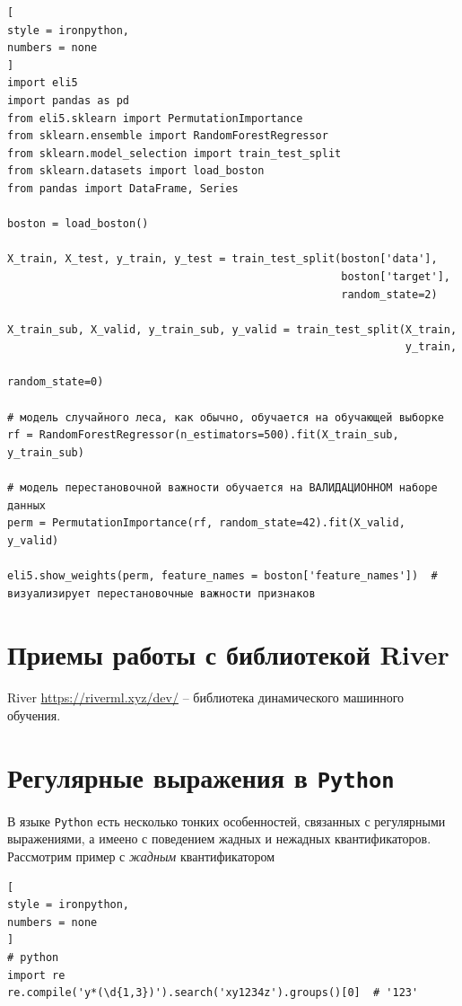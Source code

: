 \documentclass[%
	11pt,
	a4paper,
	utf8,
		]{article}
\begin{document}
\begin{lstlisting}[
style = ironpython,
numbers = none
]
import eli5
import pandas as pd
from eli5.sklearn import PermutationImportance
from sklearn.ensemble import RandomForestRegressor
from sklearn.model_selection import train_test_split
from sklearn.datasets import load_boston
from pandas import DataFrame, Series

boston = load_boston()

X_train, X_test, y_train, y_test = train_test_split(boston['data'],
                                                    boston['target'], 
                                                    random_state=2)

X_train_sub, X_valid, y_train_sub, y_valid = train_test_split(X_train,
                                                              y_train,
                                                              random_state=0)

# модель случайного леса, как обычно, обучается на обучающей выборке
rf = RandomForestRegressor(n_estimators=500).fit(X_train_sub, y_train_sub)

# модель перестановочной важности обучается на ВАЛИДАЦИОННОМ наборе данных
perm = PermutationImportance(rf, random_state=42).fit(X_valid, y_valid)

eli5.show_weights(perm, feature_names = boston['feature_names'])  # визуализирует перестановочные важности признаков
\end{lstlisting}


\section{Приемы работы с библиотекой River}

River \url{https://riverml.xyz/dev/} -- библиотека динамического машинного обучения.


\section{Регулярные выражения в \texttt{Python}}

В языке \texttt{Python} есть несколько тонких особенностей, связанных с регулярными выражениями, а имеено с поведением жадных и нежадных квантификаторов. Рассмотрим пример с \emph{жадным} квантификатором
\begin{lstlisting}[
style = ironpython,
numbers = none
]
# python
import re
re.compile('y*(\d{1,3})').search('xy1234z').groups()[0]  # '123'
\end{lstlisting}
\end{document}

